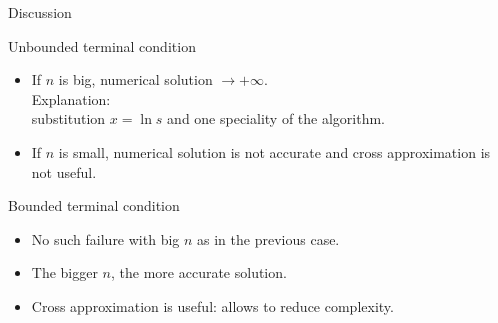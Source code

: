 \documentclass{beamer}
\theoremstyle{definition}
\theoremstyle{plain}
\theoremstyle{remark}
\begin{document}
		\begin{frame}{Discussion}
			\vspace{-7pt}
			\begin{block}{Unbounded terminal condition}
				\begin{itemize}
					\item If $n$ is big, numerical solution $\rightarrow +\infty$.\\
					Explanation: \\substitution $x = \ln s$ and one speciality of the algorithm.
					\item If $n$ is small, numerical solution is not accurate and cross approximation is not useful.
				\end{itemize}
			\end{block}
			\vspace{-3pt}
			\begin{block}{Bounded terminal condition}
				\begin{itemize}
					\item No such failure with big $n$ as in the previous case.
					\item The bigger $n$, the more accurate solution.
					\item Cross approximation is useful: allows to reduce complexity.
				\end{itemize}
			\end{block}
		\end{frame}
	
	\section*{}

		\begin{frame}{}
		\end{frame}
\end{document}
